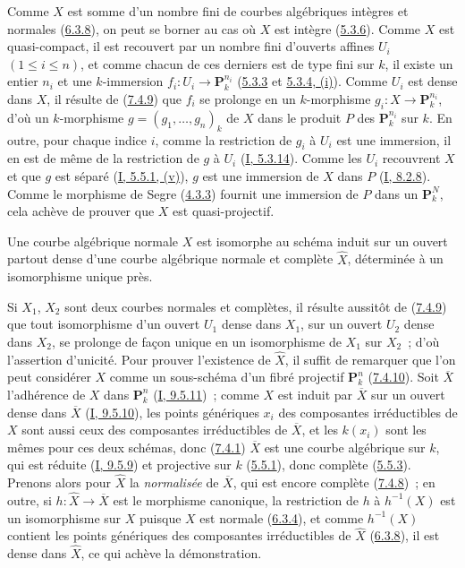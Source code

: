 Comme $X$ est somme d'un nombre fini de courbes algébriques intègres et
normales (\hyperref[II.6.3.8-fr]{6.3.8}), on peut se borner au cas où $X$ est
intègre (\hyperref[II.5.3.6-fr]{5.3.6}). Comme $X$ est quasi-compact, il est
recouvert par un nombre fini d'ouverts affines $U_i$ $(1\leq i\leq n)$, et
comme chacun de ces derniers est de type fini sur $k$, il existe un entier
$n_i$ et une $k$-immersion $f_i:U_i\to\mathbf{P}_k^{n_i}$
(\hyperref[II.5.3.3-fr]{5.3.3} et
\hyperref[II.5.3.4-fr]{5.3.4, (i)}). Comme $U_i$ est dense dans $X$, il résulte
de (\hyperref[II.7.4.9-fr]{7.4.9}) que $f_i$ se prolonge en un $k$-morphisme
$g_i:X\to\mathbf{P}_k^{n_i}$, d'où un $k$-morphisme
$g=(g_1,\ldots,g_n)_k$ de $X$ dans le produit $P$ des
$\mathbf{P}_k^{n_i}$ sur $k$. En outre, pour chaque indice $i$, comme la
restriction de $g_i$ à $U_i$ est une immersion, il en est de même de la
restriction de $g$ à $U_i$ (\hyperref[I.5.3.14-fr]{I, 5.3.14}). Comme les
$U_i$ recouvrent $X$ et que $g$ est séparé
(\hyperref[I.5.5.1-fr]{I, 5.5.1, (v)}), $g$ est une immersion de $X$ dans $P$
(\hyperref[I.8.2.8-fr]{I, 8.2.8}). Comme le morphisme de Segre
(\hyperref[II.4.3.3-fr]{4.3.3}) fournit une immersion de $P$ dans un
$\mathbf{P}_k^N$, cela achève de prouver que $X$ est quasi-projectif.

\begin{corollary}[7.4.11]
\label{II.7.4.11-fr}
Une courbe algébrique normale $X$ est isomorphe au schéma induit sur un ouvert
partout dense d'une courbe algébrique normale et complète $\widehat{X}$,
déterminée à un isomorphisme unique près.
\end{corollary}

Si $X_1$, $X_2$ sont deux courbes normales et complètes, il résulte aussitôt
de (\hyperref[II.7.4.9-fr]{7.4.9}) que tout isomorphisme d'un ouvert $U_1$
dense dans $X_1$, sur un ouvert $U_2$ dense dans $X_2$, se prolonge de façon
unique en un isomorphisme de $X_1$ sur $X_2$~; d'où l'assertion d'unicité. Pour
prouver l'existence de $\widehat{X}$, il suffit de remarquer que l'on peut
considérer $X$ comme un sous-schéma d'un fibré projectif $\mathbf{P}_k^n$
(\hyperref[II.7.4.10-fr]{7.4.10}). Soit $\overline{X}$ l'adhérence de $X$ dans
$\mathbf{P}_k^n$ (\hyperref[I.9.5.11-fr]{I, 9.5.11})~; comme $X$ est induit
par $\overline{X}$ sur un ouvert dense dans $\overline{X}$
(\hyperref[I.9.5.10-fr]{I, 9.5.10}), les points génériques $x_i$ des
composantes irréductibles de $X$ sont aussi ceux des composantes irréductibles
de $\overline{X}$, et les $k(x_i)$ sont les mêmes pour ces deux schémas, donc
(\hyperref[II.7.4.1-fr]{7.4.1}) $\overline{X}$ est une courbe algébrique sur
$k$, qui est réduite (\hyperref[I.9.5.9-fr]{I, 9.5.9}) et projective sur $k$
(\hyperref[II.5.5.1-fr]{5.5.1}), donc complète
(\hyperref[II.5.5.3-fr]{5.5.3}). Prenons alors pour $\widehat{X}$ la
\emph{normalisée} de $\overline{X}$, qui est encore complète
(\hyperref[II.7.4.8-fr]{7.4.8})~; en outre, si
$h:\widehat{X}\to\overline{X}$ est le morphisme canonique, la restriction de
$h$ à $h^{-1}(X)$ est un isomorphisme sur $X$ puisque $X$ est normale
(\hyperref[II.6.3.4-fr]{6.3.4}), et comme $h^{-1}(X)$ contient les points
génériques des composantes irréductibles de $\widehat{X}$
(\hyperref[II.6.3.8-fr]{6.3.8}), il est dense dans $\widehat{X}$, ce qui achève
la démonstration.

